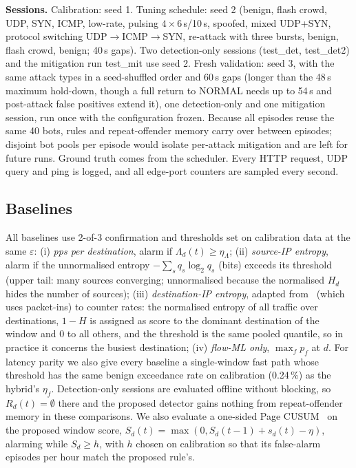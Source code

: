 \documentclass[conference]{IEEEtran}
\begin{document}
\textbf{Sessions.} Calibration: seed 1. Tuning schedule: seed 2 (benign, flash crowd, UDP, SYN, ICMP, low-rate, pulsing $4\times$6\,s/10\,s, spoofed, mixed UDP+SYN, protocol switching UDP$\to$ICMP$\to$SYN, re-attack with three bursts, benign, flash crowd, benign; 40\,s gaps). Two detection-only sessions (test\_det, test\_det2) and the mitigation run test\_mit use seed 2. Fresh validation: seed 3, with the same attack types in a seed-shuffled order and 60\,s gaps (longer than the 48\,s maximum hold-down, though a full return to NORMAL needs up to 54\,s and post-attack false positives extend it), one detection-only and one mitigation session, run once with the configuration frozen. Because all episodes reuse the same 40 bots, rules and repeat-offender memory carry over between episodes; disjoint bot pools per episode would isolate per-attack mitigation and are left for future runs. Ground truth comes from the scheduler. Every HTTP request, UDP query and ping is logged, and all edge-port counters are sampled every second.

\subsection{Baselines}
All baselines use 2-of-3 confirmation and thresholds set on calibration data at the same $\varepsilon$: (i) \emph{pps per destination}, alarm if $\Lambda_d(t)\ge\eta_\Lambda$; (ii) \emph{source-IP entropy}, alarm if the unnormalised entropy $-\sum_s q_s\log_2 q_s$ (bits) exceeds its threshold (upper tail: many sources converging; unnormalised because the normalised $H_d$ hides the number of sources); (iii) \emph{destination-IP entropy}, adapted from~\cite{mousavi2015early} (which uses packet-ins) to counter rates: the normalised entropy of all traffic over destinations, $1-H$ is assigned as score to the dominant destination of the window and 0 to all others, and the threshold is the same pooled quantile, so in practice it concerns the busiest destination; (iv) \emph{flow-ML only}, $\max_f p_f$ at $d$. For latency parity we also give every baseline a single-window fast path whose threshold has the same benign exceedance rate on calibration (0.24\,\%) as the hybrid's $\eta_f$. Detection-only sessions are evaluated offline without blocking, so $R_d(t)=\emptyset$ there and the proposed detector gains nothing from repeat-offender memory in these comparisons. We also evaluate a one-sided Page CUSUM~\cite{page1954continuous} on the proposed window score, $S_d(t)=\max(0,S_d(t-1)+s_d(t)-\eta)$, alarming while $S_d\ge h$, with $h$ chosen on calibration so that its false-alarm episodes per hour match the proposed rule's.
\end{document}
